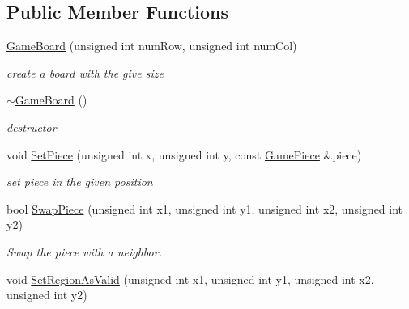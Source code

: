 \subsection*{Public Member Functions}
\begin{DoxyCompactItemize}
\item 
\hypertarget{class_game_board_afed551e9c127df283a47e8124b1318a4}{\hyperlink{class_game_board_afed551e9c127df283a47e8124b1318a4}{Game\-Board} (unsigned int num\-Row, unsigned int num\-Col)}\label{class_game_board_afed551e9c127df283a47e8124b1318a4}

\begin{DoxyCompactList}\small\item\em create a board with the give size \end{DoxyCompactList}\item 
\hypertarget{class_game_board_a48e19b4953c87cc5eea1f9152d09499e}{\hyperlink{class_game_board_a48e19b4953c87cc5eea1f9152d09499e}{$\sim$\-Game\-Board} ()}\label{class_game_board_a48e19b4953c87cc5eea1f9152d09499e}

\begin{DoxyCompactList}\small\item\em destructor \end{DoxyCompactList}\item 
\hypertarget{class_game_board_aba09f382ac8efd967505bbcbe93ba8fc}{void \hyperlink{class_game_board_aba09f382ac8efd967505bbcbe93ba8fc}{Set\-Piece} (unsigned int x, unsigned int y, const \hyperlink{class_game_piece}{Game\-Piece} \&piece)}\label{class_game_board_aba09f382ac8efd967505bbcbe93ba8fc}

\begin{DoxyCompactList}\small\item\em set piece in the given position \end{DoxyCompactList}\item 
\hypertarget{class_game_board_a8ac26b97976d4fc0b80f74486eab45a1}{bool \hyperlink{class_game_board_a8ac26b97976d4fc0b80f74486eab45a1}{Swap\-Piece} (unsigned int x1, unsigned int y1, unsigned int x2, unsigned int y2)}\label{class_game_board_a8ac26b97976d4fc0b80f74486eab45a1}

\begin{DoxyCompactList}\small\item\em Swap the piece with a neighbor. \end{DoxyCompactList}\item 
\hypertarget{class_game_board_abc9f68a6a81a3ec70d07224e9309b67f}{void \hyperlink{class_game_board_abc9f68a6a81a3ec70d07224e9309b67f}{Set\-Region\-As\-Valid} (unsigned int x1, unsigned int y1, unsigned int x2, unsigned int y2)}\label{class_game_board_abc9f68a6a81a3ec70d07224e9309b67f}


\end{DoxyCompactItemize}
